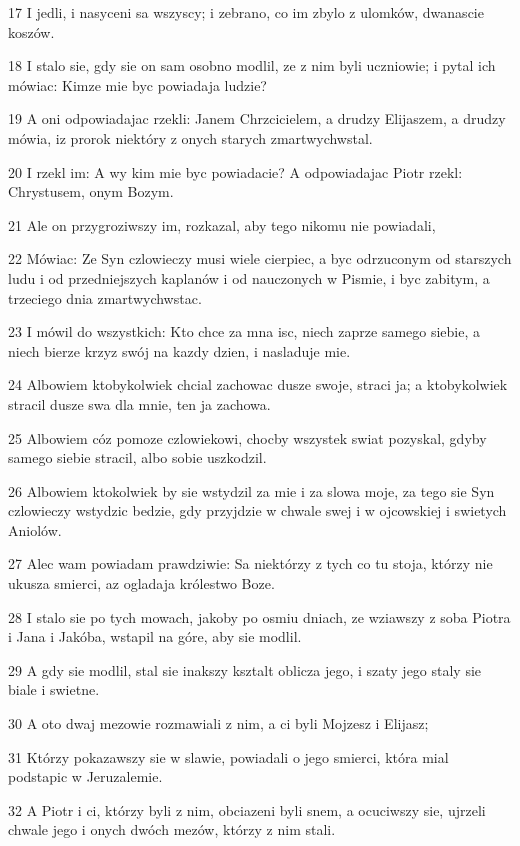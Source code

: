 \par 17 I jedli, i nasyceni sa wszyscy; i zebrano, co im zbylo z ulomków, dwanascie koszów.
\par 18 I stalo sie, gdy sie on sam osobno modlil, ze z nim byli uczniowie; i pytal ich mówiac: Kimze mie byc powiadaja ludzie?
\par 19 A oni odpowiadajac rzekli: Janem Chrzcicielem, a drudzy Elijaszem, a drudzy mówia, iz prorok niektóry z onych starych zmartwychwstal.
\par 20 I rzekl im: A wy kim mie byc powiadacie? A odpowiadajac Piotr rzekl: Chrystusem, onym Bozym.
\par 21 Ale on przygroziwszy im, rozkazal, aby tego nikomu nie powiadali,
\par 22 Mówiac: Ze Syn czlowieczy musi wiele cierpiec, a byc odrzuconym od starszych ludu i od przedniejszych kaplanów i od nauczonych w Pismie, i byc zabitym, a trzeciego dnia zmartwychwstac.
\par 23 I mówil do wszystkich: Kto chce za mna isc, niech zaprze samego siebie, a niech bierze krzyz swój na kazdy dzien, i nasladuje mie.
\par 24 Albowiem ktobykolwiek chcial zachowac dusze swoje, straci ja; a ktobykolwiek stracil dusze swa dla mnie, ten ja zachowa.
\par 25 Albowiem cóz pomoze czlowiekowi, chocby wszystek swiat pozyskal, gdyby samego siebie stracil, albo sobie uszkodzil.
\par 26 Albowiem ktokolwiek by sie wstydzil za mie i za slowa moje, za tego sie Syn czlowieczy wstydzic bedzie, gdy przyjdzie w chwale swej i w ojcowskiej i swietych Aniolów.
\par 27 Alec wam powiadam prawdziwie: Sa niektórzy z tych co tu stoja, którzy nie ukusza smierci, az ogladaja królestwo Boze.
\par 28 I stalo sie po tych mowach, jakoby po osmiu dniach, ze wziawszy z soba Piotra i Jana i Jakóba, wstapil na góre, aby sie modlil.
\par 29 A gdy sie modlil, stal sie inakszy ksztalt oblicza jego, i szaty jego staly sie biale i swietne.
\par 30 A oto dwaj mezowie rozmawiali z nim, a ci byli Mojzesz i Elijasz;
\par 31 Którzy pokazawszy sie w slawie, powiadali o jego smierci, która mial podstapic w Jeruzalemie.
\par 32 A Piotr i ci, którzy byli z nim, obciazeni byli snem, a ocuciwszy sie, ujrzeli chwale jego i onych dwóch mezów, którzy z nim stali.
